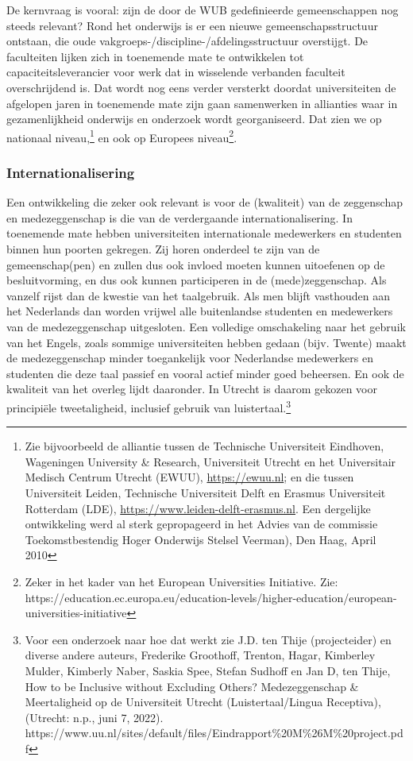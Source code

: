 \documentclass{jote-book}
\begin{document}
	De kernvraag is vooral: zijn de door de WUB gedefinieerde gemeenschappen nog steeds relevant? Rond het onderwijs is er een nieuwe gemeenschapsstructuur ontstaan, die oude vakgroeps-/discipline-/afdelingsstructuur overstijgt. De faculteiten lijken zich in toenemende mate te ontwikkelen tot capaciteitsleverancier voor werk dat in wisselende verbanden faculteit overschrijdend is. Dat wordt nog eens verder versterkt doordat universiteiten de afgelopen jaren in toenemende mate zijn gaan samenwerken in allianties waar in gezamenlijkheid onderwijs en onderzoek wordt georganiseerd. Dat zien we op nationaal niveau,\footnote{Zie bijvoorbeeld de alliantie tussen de Technische Universiteit Eindhoven, Wageningen University \& Research, Universiteit Utrecht en het Universitair Medisch Centrum Utrecht (EWUU), \href{https://ewuu.nl}{https://ewuu.nl}; en die tussen Universiteit Leiden, Technische Universiteit Delft en Erasmus Universiteit Rotterdam (LDE), \href{https://www.leiden-delft-erasmus.nl}{https://www.leiden-delft-erasmus.nl}. Een dergelijke ontwikkeling werd al sterk gepropageerd in het Advies van de commissie Toekomstbestendig Hoger Onderwijs Stelsel Veerman), Den Haag, April 2010} en ook op Europees niveau\footnote{Zeker in het kader van het European Universities Initiative. Zie: https://education.ec.europa.eu/education-levels/higher-education/european-universities-initiative}.



	\subsubsection{Internationalisering}



	Een ontwikkeling die zeker ook relevant is voor de (kwaliteit) van de zeggenschap en medezeggenschap is die van de verdergaande internationalisering. In toenemende mate hebben universiteiten internationale medewerkers en studenten binnen hun poorten gekregen. Zij horen onderdeel te zijn van de gemeenschap(pen) en zullen dus ook invloed moeten kunnen uitoefenen op de besluitvorming, en dus ook kunnen participeren in de (mede)zeggenschap. Als vanzelf rijst dan de kwestie van het taalgebruik. Als men blijft vasthouden aan het Nederlands dan worden vrijwel alle buitenlandse studenten en medewerkers van de medezeggenschap uitgesloten. Een volledige omschakeling naar het gebruik van het Engels, zoals sommige universiteiten hebben gedaan (bijv. Twente) maakt de medezeggenschap minder toegankelijk voor Nederlandse medewerkers en studenten die deze taal passief en vooral actief minder goed beheersen. En ook de kwaliteit van het overleg lijdt daaronder. In Utrecht is daarom gekozen voor principiële tweetaligheid, inclusief gebruik van luistertaal.\footnote{Voor een onderzoek naar hoe dat werkt zie J.D. ten Thije (projecteider) en diverse andere auteurs, Frederike Groothoff, Trenton, Hagar, Kimberley Mulder, Kimberly Naber, Saskia Spee, Stefan Sudhoff en Jan D, ten Thije, How to be Inclusive without Excluding Others? Medezeggenschap \& Meertaligheid op de Universiteit Utrecht (Luistertaal/Lingua Receptiva), (Utrecht: n.p., juni 7, 2022). https://www.uu.nl/sites/default/files/Eindrapport\%20M\%26M\%20project.pdf}
\end{document}
